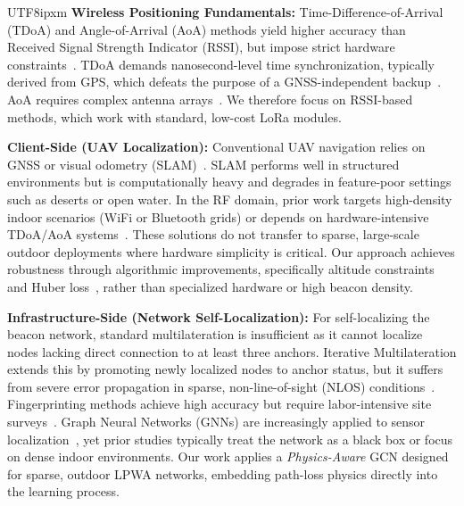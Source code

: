 \documentclass[a4paper,10pt,twocolumn]{article}
\begin{document}
\begin{CJK}{UTF8}{ipxm}
\textbf{Wireless Positioning Fundamentals:}
Time-Difference-of-Arrival (TDoA) and Angle-of-Arrival (AoA) methods yield higher accuracy than Received Signal Strength Indicator (RSSI), but impose strict hardware constraints~\cite{zafari2019survey}.
TDoA demands nanosecond-level time synchronization, typically derived from GPS, which defeats the purpose of a GNSS-independent backup~\cite{pospisil2020tdoa}.
AoA requires complex antenna arrays~\cite{ref_aoa_lora}.
We therefore focus on RSSI-based methods, which work with standard, low-cost LoRa modules.

\textbf{Client-Side (UAV Localization):}
Conventional UAV navigation relies on GNSS or visual odometry (SLAM)~\cite{ref_slam}.
SLAM performs well in structured environments but is computationally heavy and degrades in feature-poor settings such as deserts or open water.
In the RF domain, prior work targets high-density indoor scenarios (WiFi or Bluetooth grids) or depends on hardware-intensive TDoA/AoA systems~\cite{vazquez2020rssi}.
These solutions do not transfer to sparse, large-scale outdoor deployments where hardware simplicity is critical.
Our approach achieves robustness through algorithmic improvements, specifically altitude constraints and Huber loss~\cite{huber1964robust}, rather than specialized hardware or high beacon density.

\textbf{Infrastructure-Side (Network Self-Localization):}
For self-localizing the beacon network, standard multilateration is insufficient as it cannot localize nodes lacking direct connection to at least three anchors.
Iterative Multilateration extends this by promoting newly localized nodes to anchor status, but it suffers from severe error propagation in sparse, non-line-of-sight (NLOS) conditions~\cite{hada2025hybrid}.
Fingerprinting methods achieve high accuracy but require labor-intensive site surveys~\cite{purohit2020fingerprinting}.
Graph Neural Networks (GNNs) are increasingly applied to sensor localization~\cite{yan2021gnn}, yet prior studies typically treat the network as a black box or focus on dense indoor environments.
Our work applies a \textit{Physics-Aware} GCN designed for sparse, outdoor LPWA networks, embedding path-loss physics directly into the learning process.


\end{CJK}
\end{document}
